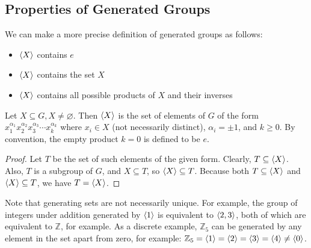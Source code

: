 \subsection{Properties of Generated Groups}
We can make a more precise definition of generated groups as follows:
\begin{itemize}
	\item $\langle X \rangle$ contains $e$
	\item $\langle X \rangle$ contains the set $X$
	\item $\langle X \rangle$ contains all possible products of $X$ and their inverses
\end{itemize}

\begin{proposition}
	Let $X \subseteq G, X \neq \varnothing$. Then $\langle X \rangle$ is the set of elements of $G$ of the form $x_1^{\alpha_1} x_2^{\alpha_2} x_3^{\alpha_3} \cdots x_k^{\alpha_k}$ where $x_i \in X$ (not necessarily distinct), $\alpha_i = \pm 1$, and $k \geq 0$. By convention, the empty product $k=0$ is defined to be $e$.
\end{proposition}
\begin{proof}
	Let $T$ be the set of such elements of the given form. Clearly, $T \subseteq \langle X \rangle$. Also, $T$ is a subgroup of $G$, and $X \subseteq T$, so $\langle X \rangle \subseteq T$. Because both $T \subseteq \langle X \rangle$ and $\langle X \rangle \subseteq T$, we have $T = \langle X \rangle$.
\end{proof}
Note that generating sets are not necessarily unique. For example, the group of integers under addition generated by $\langle 1 \rangle$ is equivalent to $\langle 2, 3 \rangle$, both of which are equivalent to $\mathbb Z$, for example. As a discrete example, $\mathbb Z_5$ can be generated by any element in the set apart from zero, for example: $\mathbb Z_5 = \langle 1 \rangle = \langle 2 \rangle = \langle 3 \rangle = \langle 4 \rangle \neq \langle 0 \rangle$.

